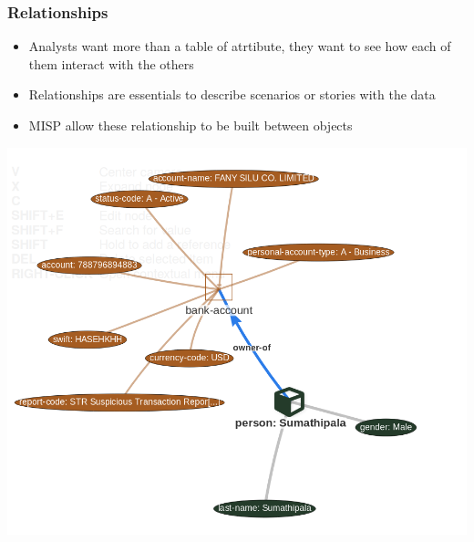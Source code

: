 \begin{frame}
    \frametitle{Relationships}
    \begin{itemize}
        \item Analysts want more than a table of atrtibute, they want to see how each of them interact with the others
        \item Relationships are essentials to describe scenarios or stories with the data
        \item MISP allow these relationship to be built between objects
    \end{itemize}
    \includegraphics[scale=1.0]{pictures/relationship.png}
\end{frame}

